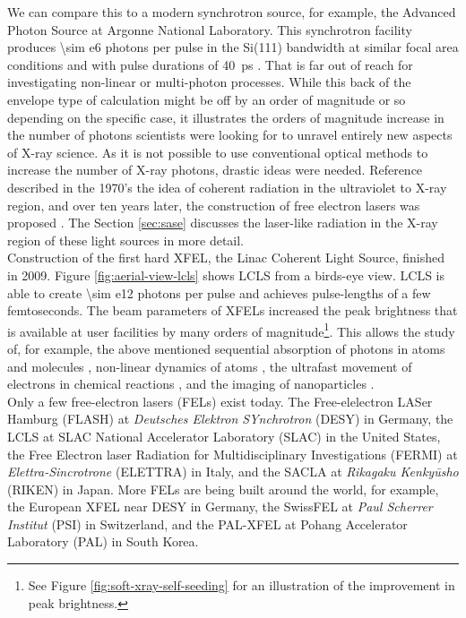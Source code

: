 We can compare this to a modern synchrotron source, for example, the Advanced Photon Source at Argonne National Laboratory. This synchrotron facility produces \num{\sim e6} photons per pulse in the Si(111) bandwidth at similar focal area conditions and with pulse durations of \SI{40}{\pico\second} \cite{Young-2017-PC}. That is far out of reach for investigating non-linear or multi-photon processes. While this back of the envelope type of calculation might be off by an order of magnitude or so depending on the specific case, it illustrates the orders of magnitude increase in the number of photons scientists were looking for to unravel entirely new aspects of X-ray science. As it is not possible to use conventional optical methods to increase the number of X-ray photons, drastic ideas were needed. Reference \citep{Madey-1971-JAP} described in the 1970's the idea of coherent radiation in the ultraviolet to X-ray region, and over ten years later, the construction of free electron lasers was proposed \citep{Kondratenko-1980-PA,Bonifacio-1984-OC}. The Section \ref{sec:sase} discusses the laser-like radiation in the X-ray region of these light sources in more detail.\\[1\baselineskip]
%
Construction of the first hard XFEL, the Linac Coherent Light Source, finished in 2009. Figure \ref{fig:aerial-view-lcls} shows LCLS from a birds-eye view. LCLS is able to create \num{\sim e12} photons per pulse and achieves pulse-lengths of a few femtoseconds. The beam parameters of XFELs increased the peak brightness that is available at user facilities by many orders of magnitude\footnote{See Figure \ref{fig:soft-xray-self-seeding} for an illustration of the improvement in peak brightness.}. This allows the study of, for example, the above mentioned sequential absorption of photons in atoms and molecules \cite{Young-2010-Nature,Berrah-2011-PNAS}, non-linear dynamics of atoms \cite{Rohringer-2012-Nature}, the ultrafast movement of electrons in chemical reactions \cite{Dell-Angela-2013-Science,Picon-2016-NatComm,Rudenko-2017-Nature}, and the imaging of nanoparticles \cite{Seibert-2011-Nature,Gorkhover-2012-PRL}.\\[1\baselineskip]
%
Only a few free-electron lasers (FELs) exist today. The Free-elelectron LASer Hamburg (FLASH) at \textit{Deutsches Elektron SYnchrotron} (DESY) in Germany, the LCLS at SLAC National Accelerator Laboratory (SLAC) in the United States, the Free Electron laser Radiation for Multidisciplinary Investigations (FERMI) at \textit{Elettra-Sincrotrone} (ELETTRA) in Italy, and the SACLA at \textit{Rikagaku Kenkyūsho} (RIKEN) in Japan. More FELs are being built around the world, for example, the European XFEL near DESY in Germany, the SwissFEL at \textit{Paul Scherrer Institut} (PSI) in Switzerland, and the PAL-XFEL at Pohang Accelerator Laboratory (PAL) in South Korea.
%
%
%
